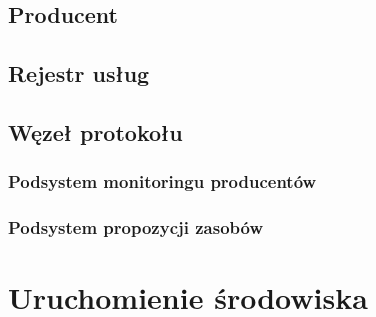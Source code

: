 \restoregeometry
\newpage

\subsection{Producent}
\subsection{Rejestr usług}
\subsection{Węzeł protokołu}
\subsubsection{Podsystem monitoringu producentów}
\subsubsection{Podsystem propozycji zasobów}

\section{Uruchomienie środowiska}